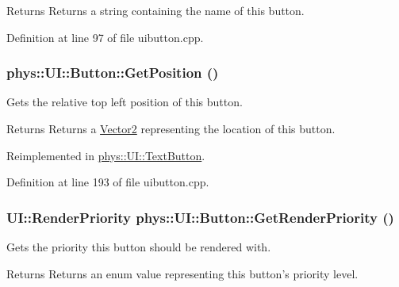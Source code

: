 \begin{DoxyReturn}{Returns}
Returns a string containing the name of this button. 
\end{DoxyReturn}


Definition at line 97 of file uibutton.cpp.

\hypertarget{classphys_1_1UI_1_1Button_adfa08ace813b88cae114e18f88942642}{
\subsubsection[{GetPosition}]{ phys::UI::Button::GetPosition ()}}
\label{d8/d88/classphys_1_1UI_1_1Button_adfa08ace813b88cae114e18f88942642}


Gets the relative top left position of this button. 

\begin{DoxyReturn}{Returns}
Returns a \hyperlink{classphys_1_1Vector2}{Vector2} representing the location of this button. 
\end{DoxyReturn}


Reimplemented in \hyperlink{classphys_1_1UI_1_1TextButton_a09768e0666a109b7d35fd8b78240cfd3}{phys::UI::TextButton}.



Definition at line 193 of file uibutton.cpp.

\hypertarget{classphys_1_1UI_1_1Button_aa17ffbc9b0d4eed151ff5ecbf93d88b8}{
\subsubsection[{GetRenderPriority}]{\setlength{\rightskip}{0pt plus 5cm}UI::RenderPriority phys::UI::Button::GetRenderPriority ()}}
\label{d8/d88/classphys_1_1UI_1_1Button_aa17ffbc9b0d4eed151ff5ecbf93d88b8}


Gets the priority this button should be rendered with. 

\begin{DoxyReturn}{Returns}
Returns an enum value representing this button's priority level. 
\end{DoxyReturn}


